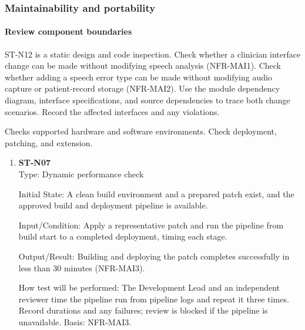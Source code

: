 \documentclass[12pt, titlepage]{article}
\begin{document}
\subsubsection{Maintainability and portability}

\paragraph{Review component boundaries}
ST-N12 is a static design and code inspection. Check whether a clinician
interface change can be made without modifying speech analysis (NFR-MAI1).
Check whether adding a speech error type can be made without modifying
audio capture or patient-record storage (NFR-MAI2). Use the module dependency
diagram, interface specifications, and source dependencies to trace both
change scenarios. Record the affected interfaces and any violations.

Checks supported hardware and software environments. Check deployment, patching, and extension.

\begin{enumerate}
    \item \textbf{ST-N07}\\

    Type: Dynamic performance check

    Initial State: A clean build environment and a prepared patch exist, and
    the approved build and deployment pipeline is available.

    Input/Condition: Apply a representative patch and run the pipeline from
    build start to a completed deployment, timing each stage.

    Output/Result: Building and deploying the patch completes successfully in
    less than 30 minutes (NFR-MAI3).

    How test will be performed: The Development Lead and an independent
    reviewer time the pipeline run from pipeline logs and repeat it three
    times. Record durations and any failures; review is blocked if the
    pipeline is unavailable. Basis: NFR-MAI3.
\end{enumerate}
\end{document}
